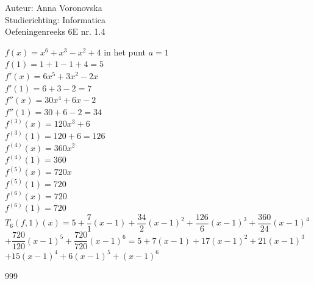 \documentclass[a4paper]{article}
\begin{document}
  
\noindent \large Auteur: Anna Voronovska \\
\noindent \large Studierichting: Informatica\\
\noindent \large Oefeningenreeks 6E nr. 1.4\\

\medskip

\normalsize

$f(x) = x^6 + x^3 - x^2 + 4$ in het punt $a = 1$\\

$f(1) = 1 + 1 - 1 + 4 = 5$\\

$f'(x) = 6x^5 + 3x^2 - 2x$\\ 

$f'(1) = 6 + 3 - 2 = 7$\\

$f''(x) = 30x^4 + 6x - 2$\\

$f''(1) = 30 + 6 - 2 = 34$\\

$f^{(3)}(x) = 120x^3 + 6$\\

$f^{(3)}(1) = 120 + 6 = 126$ \\

$f^{(4)}(x) = 360x^2$\\

$f^{(4)}(1) = 360$\\

$f^{(5)}(x) = 720x$\\

$f^{(5)}(1) = 720$\\

    
$f^{(6)}(x) = 720$\\

$f^{(6)}(1) = 720$\\

$T_6(f, 1)(x) = 5 + \dfrac{7}{1}(x-1) + \dfrac{34}{2}(x-1)^2 + \dfrac{126}{6}(x-1)^3 + \dfrac{360}{24}(x-1)^4$\\

$+ \dfrac{720}{120}(x-1)^5 + \dfrac{720}{720}(x-1)^6 = 5 + 7(x - 1) + 17(x - 1)^2 + 21(x - 1)^3$\\

$+ 15(x - 1)^4 + 6(x - 1)^5 + (x - 1)^6$


\begin{thebibliography}{999}
\end{thebibliography}
\end{document}
